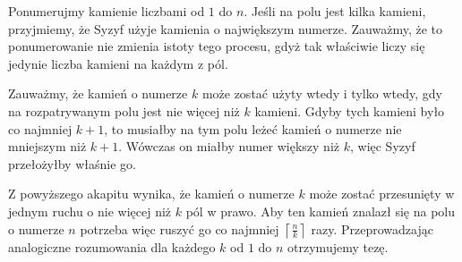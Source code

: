 \noindent
Ponumerujmy kamienie liczbami od $1$ do $n$. Jeśli na polu jest kilka kamieni, przyjmiemy, że Syzyf użyje kamienia o największym numerze. Zauważmy, że to ponumerowanie nie zmienia istoty tego procesu, gdyż tak właściwie liczy się jedynie liczba kamieni na każdym z pól.

\vspace{10px}
\noindent
Zauważmy, że kamień o numerze $k$ może zostać użyty wtedy i tylko wtedy, gdy na rozpatrywanym polu jest nie więcej niż $k$ kamieni. Gdyby tych kamieni było co najmniej $k + 1$, to musiałby na tym polu leżeć kamień o numerze nie mniejszym niż $k + 1$. Wówczas on miałby numer większy niż $k$, więc Syzyf przełożyłby właśnie go.


\vspace{10px}
\noindent
Z powyższego akapitu wynika, że kamień o numerze $k$ może zostać przesunięty w jednym ruchu o nie więcej niż $k$ pól w prawo. Aby ten kamień znalazł się na polu o numerze $n$ potrzeba więc ruszyć go co najmniej $\left \lceil \frac{n}{k} \right \rceil$ razy. Przeprowadzając analogiczne rozumowania dla każdego $k$ od $1$ do $n$ otrzymujemy tezę.




